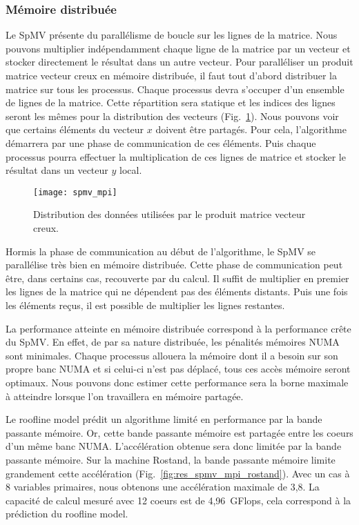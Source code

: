 \subsubsection{Mémoire distribuée}
Le SpMV présente du parallélisme de boucle sur les lignes de la matrice.
%
Nous pouvons multiplier indépendamment chaque ligne de la matrice par un vecteur et stocker directement le résultat dans un autre vecteur.
%
Pour paralléliser un produit matrice vecteur creux en mémoire distribuée, il faut tout d'abord distribuer la matrice sur tous les processus.
%
Chaque processus devra s'occuper d'un ensemble de lignes de la matrice.
%
Cette répartition sera statique et les indices des lignes seront les mêmes pour la distribution des vecteurs (Fig.~\ref{fig:spmv_mpi}).
%
Nous pouvons voir que certains éléments du vecteur $x$ doivent être partagés.
%
Pour cela, l'algorithme démarrera par une phase de communication de ces éléments.
%
Puis chaque processus pourra effectuer la multiplication de ces lignes de matrice et stocker le résultat dans un vecteur $y$ local.
\begin{figure}
  \centering
  \texttt{[image: spmv\_mpi]}
  \caption{Distribution des données utilisées par le produit matrice vecteur creux.}
  \label{fig:spmv_mpi}
\end{figure}
Hormis la phase de communication au début de l'algorithme, le SpMV se parallélise très bien en mémoire distribuée.
%
Cette phase de communication peut être, dans certains cas, recouverte par du calcul.
%
Il suffit de multiplier en premier les lignes de la matrice qui ne dépendent pas des éléments distants.
%
Puis une fois les éléments reçus, il est possible de multiplier les lignes restantes.

La performance atteinte en mémoire distribuée correspond à la performance crête du SpMV.
%
En effet, de par sa nature distribuée, les pénalités mémoires NUMA sont minimales.
%
Chaque processus allouera la mémoire dont il a besoin sur son propre banc NUMA et si celui-ci n'est pas déplacé, tous ces accès mémoire seront optimaux.
%
Nous pouvons donc estimer cette performance sera la borne maximale à atteindre lorsque l'on travaillera en mémoire partagée.


Le roofline model prédit un algorithme limité en performance par la bande passante mémoire.
%
Or, cette bande passante mémoire est partagée entre les coeurs d'un même banc NUMA.
%
L'accélération obtenue sera donc limitée par la bande passante mémoire.
%
Sur la machine Rostand, la bande passante mémoire limite grandement cette accélération (Fig.~\ref{fig:res_spmv_mpi_rostand}).
%
Avec un cas à 8 variables primaires, nous obtenons une accélération maximale de 3,8.
%
La capacité de calcul mesuré avec 12 coeurs est de 4,96~GFlops, cela correspond à la prédiction du roofline model.

